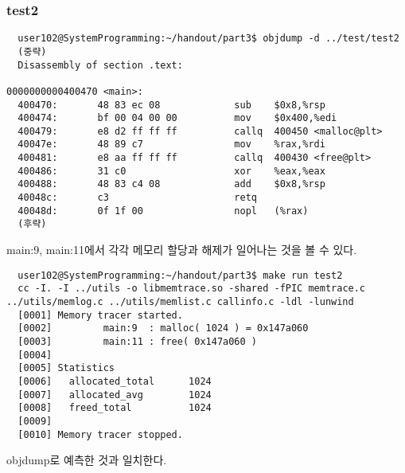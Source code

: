 \documentclass{report}
\begin{document}
\subsubsection{test2}
\begin{verbatim}
  user102@SystemProgramming:~/handout/part3$ objdump -d ../test/test2
  (중략)
  Disassembly of section .text:

0000000000400470 <main>:
  400470:       48 83 ec 08             sub    $0x8,%rsp
  400474:       bf 00 04 00 00          mov    $0x400,%edi
  400479:       e8 d2 ff ff ff          callq  400450 <malloc@plt>
  40047e:       48 89 c7                mov    %rax,%rdi
  400481:       e8 aa ff ff ff          callq  400430 <free@plt>
  400486:       31 c0                   xor    %eax,%eax
  400488:       48 83 c4 08             add    $0x8,%rsp
  40048c:       c3                      retq
  40048d:       0f 1f 00                nopl   (%rax)
  (후략)
\end{verbatim}
main:9, main:11에서 각각 메모리 할당과 해제가 일어나는 것을 볼 수 있다.
\begin{verbatim}
  user102@SystemProgramming:~/handout/part3$ make run test2
  cc -I. -I ../utils -o libmemtrace.so -shared -fPIC memtrace.c ../utils/memlog.c ../utils/memlist.c callinfo.c -ldl -lunwind
  [0001] Memory tracer started.
  [0002]         main:9  : malloc( 1024 ) = 0x147a060
  [0003]         main:11 : free( 0x147a060 )
  [0004]
  [0005] Statistics
  [0006]   allocated_total      1024
  [0007]   allocated_avg        1024
  [0008]   freed_total          1024
  [0009]
  [0010] Memory tracer stopped.
\end{verbatim}
objdump로 예측한 것과 일치한다.
\end{document}

